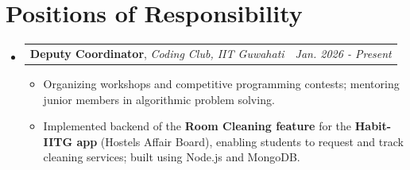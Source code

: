 \documentclass[a4paper,11pt]{article}
\makeatletter
\newcommand{\resumePOR}[3]{
\vspace{0.5mm}\item
    \begin{tabular*}{0.97\textwidth}[t]{l@{\extracolsep{\fill}}r}
        \textbf{#1},\hspace{0.3mm}#2 & \textit{\small{#3}} 
    \end{tabular*}
    \vspace{-2mm}
}
\newcommand{\resumeSubHeadingListStart}{\begin{itemize}[leftmargin=*,labelsep=0mm]}
\newcommand{\resumeCPItemListStart}{\begin{justify}\begin{itemize}[leftmargin=3ex, rightmargin=2ex, noitemsep,itemsep=0mm]\small}
\newcommand{\resumeSubHeadingListEnd}{\end{itemize}\vspace{2mm}}
\newcommand{\resumeCPItemListEnd}{\end{itemize}\end{justify}\vspace{-3.5mm}}
\makeatother
\begin{document}
\section{Positions of Responsibility}
\vspace{-0.2mm}
\resumeSubHeadingListStart
\resumePOR{Deputy Coordinator}
    { \textit{Coding Club, IIT Guwahati}}
    {Jan. 2026 - Present}
\resumeCPItemListStart
\item{\hspace{0.5mm} Organizing workshops and competitive programming contests; mentoring junior members in algorithmic problem solving.}
\item{\hspace{0.5mm} Implemented backend of the \textbf{Room Cleaning feature} for the \textbf{Habit-IITG app} (Hostels Affair Board), enabling students to request and track cleaning services; built using Node.js and MongoDB.}
\resumeCPItemListEnd
\resumeSubHeadingListEnd
\vspace{-2mm}

\end{document}
